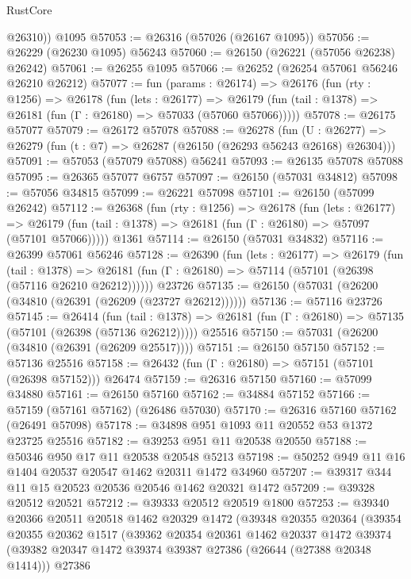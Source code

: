 \begin{lexlean}{RustCore}
\begin{coremodule}
        @26310))
    @1095
@57053 := @26316 (@57026 (@26167 @1095))
@57056 := @26229 (@26230 @1095) @56243
@57060 := @26150 (@26221 (@57056 @26238) @26242)
@57061 := @26255 @1095
@57066 := @26252 (@26254 @57061 @56246 @26210 @26212)
@57077 := fun (params : @26174) =>
  @26176
    (fun (rty : @1256) =>
    @26178
      (fun (lets : @26177) =>
      @26179 (fun (tail : @1378) => @26181 (fun (Γ : @26180) => @57033 (@57060 @57066)))))
@57078 := @26175 @57077
@57079 := @26172 @57078
@57088 := @26278
    (fun (U : @26277) => @26279 (fun (t : @7) => @26287 (@26150 (@26293 @56243 @26168) @26304)))
@57091 := @57053 (@57079 @57088) @56241
@57093 := @26135 @57078 @57088
@57095 := @26365 @57077 @6757
@57097 := @26150 (@57031 @34812)
@57098 := @57056 @34815
@57099 := @26221 @57098
@57101 := @26150 (@57099 @26242)
@57112 := @26368
    (fun (rty : @1256) =>
    @26178
      (fun (lets : @26177) =>
      @26179 (fun (tail : @1378) => @26181 (fun (Γ : @26180) => @57097 (@57101 @57066)))))
    @1361
@57114 := @26150 (@57031 @34832)
@57116 := @26399 @57061 @56246
@57128 := @26390
    (fun (lets : @26177) =>
    @26179
      (fun (tail : @1378) =>
      @26181 (fun (Γ : @26180) => @57114 (@57101 (@26398 (@57116 @26210 @26212))))))
    @23726
@57135 := @26150 (@57031 (@26200 (@34810 (@26391 (@26209 (@23727 @26212))))))
@57136 := @57116 @23726
@57145 := @26414
    (fun (tail : @1378) => @26181 (fun (Γ : @26180) => @57135 (@57101 (@26398 (@57136 @26212)))))
    @25516
@57150 := @57031 (@26200 (@34810 (@26391 (@26209 @25517))))
@57151 := @26150 @57150
@57152 := @57136 @25516
@57158 := @26432 (fun (Γ : @26180) => @57151 (@57101 (@26398 @57152))) @26474
@57159 := @26316 @57150
@57160 := @57099 @34880
@57161 := @26150 @57160
@57162 := @34884 @57152
@57166 := @57159 (@57161 @57162) (@26486 @57030)
@57170 := @26316 @57160 @57162 (@26491 @57098)
@57178 := @34898 @951 @1093 @11 @20552 @53 @1372 @23725 @25516
@57182 := @39253 @951 @11 @20538 @20550
@57188 := @50346 @950 @17 @11 @20538 @20548 @5213
@57198 := @50252 @949 @11 @16 @1404 @20537 @20547 @1462 @20311 @1472 @34960
@57207 := @39317 @344 @11 @15 @20523 @20536 @20546 @1462 @20321 @1472
@57209 := @39328 @20512 @20521
@57212 := @39333 @20512 @20519 @1800
@57253 := @39340
    @20366
    @20511
    @20518
    @1462
    @20329
    @1472
    (@39348
      @20355
      @20364
      (@39354
        @20355
        @20362
        @1517
        (@39362
          @20354
          @20361
          @1462
          @20337
          @1472
          @39374
          (@39382 @20347 @1472 @39374 @39387 @27386 (@26644 (@27388 @20348 @1414)))
          @27386

\end{coremodule}
\end{lexlean}
